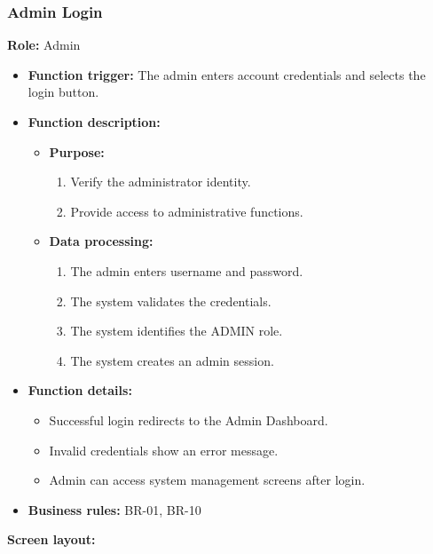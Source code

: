 \subsubsection{Admin Login}

\textbf{Role:} Admin

\begin{itemize}
    \item \textbf{Function trigger:} The admin enters account credentials and selects the login button.

    \item \textbf{Function description:}
    \begin{itemize}
        \item \textbf{Purpose:}
        \begin{enumerate}
            \item Verify the administrator identity.
            \item Provide access to administrative functions.
        \end{enumerate}

        \item \textbf{Data processing:}
        \begin{enumerate}
            \item The admin enters username and password.
            \item The system validates the credentials.
            \item The system identifies the ADMIN role.
            \item The system creates an admin session.
        \end{enumerate}
    \end{itemize}

    \item \textbf{Function details:}
    \begin{itemize}
        \item Successful login redirects to the Admin Dashboard.
        \item Invalid credentials show an error message.
        \item Admin can access system management screens after login.
    \end{itemize}
    
    \item \textbf{Business rules:} BR-01, BR-10

\end{itemize}

\textbf{Screen layout:}

